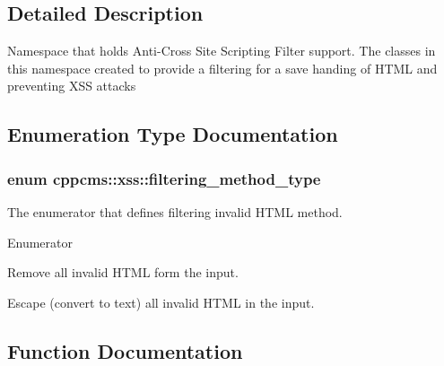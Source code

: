 \subsection{Detailed Description}
Namespace that holds Anti-\/\-Cross Site Scripting Filter support. The classes in this namespace created to provide a filtering for a save handing of H\-T\-M\-L and preventing X\-S\-S attacks 

\subsection{Enumeration Type Documentation}
\subsubsection[{filtering\-\_\-method\-\_\-type}]{\setlength{\rightskip}{0pt plus 5cm}enum {\bf cppcms\-::xss\-::filtering\-\_\-method\-\_\-type}}\label{namespacecppcms_1_1xss_a78682352617884a1eb716ebf2a62343d}


The enumerator that defines filtering invalid H\-T\-M\-L method. 

\begin{Desc}
\item[Enumerator]\par
\begin{description}
\item[{\em 
remove\-\_\-invalid\label{namespacecppcms_1_1xss_a78682352617884a1eb716ebf2a62343da5df42d96e38bf54cc8daa31ba8ab7e44}
}]Remove all invalid H\-T\-M\-L form the input. \item[{\em 
escape\-\_\-invalid\label{namespacecppcms_1_1xss_a78682352617884a1eb716ebf2a62343dae660331d92070806a4a0bd20ebeee94f}
}]Escape (convert to text) all invalid H\-T\-M\-L in the input. \end{description}
\end{Desc}


\subsection{Function Documentation}
